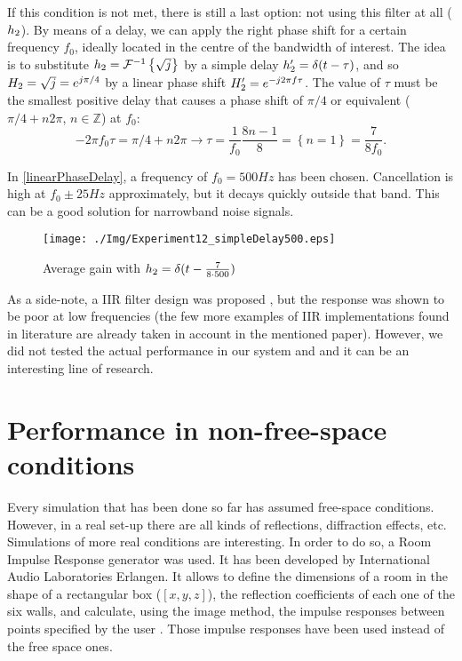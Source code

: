 If this condition is not met, there is still a last option: not using this filter at all ($\freqFilter[time][phase]$). By means of a delay, we can apply the right phase shift for a certain frequency $f_0$, ideally located in the centre of the bandwidth of interest. The idea is to substitute $\freqFilter[time][phase] = \FourierTransform{\sqrt{j}}[inverse]$ by a simple delay $\freqFilter[time][phase]' = \delta(t - \tau)$, and so $\freqFilter[frequency][phase] = \sqrt{j} = e^{j\pi/4}$ by a linear phase shift $\freqFilter[frequency][phase]' = e^{-j2\pi f \tau}$. The value of $\tau$ must be the smallest positive delay that causes a phase shift of $\pi/4$ or equivalent ($\pi/4 + n2\pi$, $n \in \mathbb{Z}$) at $f_0$:
\begin{equation}
	-2\pi f_0 \tau = \pi/4 + n2\pi \rightarrow \tau = \frac{1}{f_0}\frac{8n - 1}{8} = \left\{n = 1\right\} = \frac{7}{8f_0}.
\end{equation}

In \autoref{linearPhaseDelay}, a frequency of $f_0 = 500\si{Hz}$ has been chosen. Cancellation is high at $f_0 \pm 25 \si{Hz}$ approximately, but it decays quickly outside that band. This can be a good solution for narrowband noise signals.

\begin{figure}
	\centering
	\texttt{[image: ./Img/Experiment12\_simpleDelay500.eps]}
	\caption[Average gain with frequency linear phase shift filter]{Average gain with $\freqFilter[time][phase] = \delta(t - \frac{7}{8\cdot 500})$}
	\label{linearPhaseDelay}
\end{figure}

As a side-note, a IIR filter design was proposed \cite{FrankSchutz2015}, but the response was shown to be poor at low frequencies (the few more examples of IIR implementations found in literature are already taken in account in the mentioned paper). However, we did not tested the actual performance in our system and and it can be an interesting line of research.

\section{Performance in non-free-space conditions}
Every simulation that has been done so far has assumed free-space conditions. However, in a real set-up there are all kinds of reflections, diffraction effects, etc. Simulations of more real conditions are interesting. In order to do so, a Room Impulse Response generator was used. It has been developed by International Audio Laboratories Erlangen. It allows to define the dimensions of a room in the shape of a rectangular box ($[x,y,z]$), the reflection coefficients of each one of the six walls, and calculate, using the image method, the impulse responses between points specified by the user \cite{RIRgenerator2}. Those impulse responses have been used instead of the free space ones.


